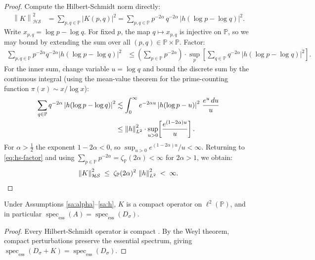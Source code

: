 \documentclass[12pt,letterpaper]{article}
\theoremstyle{definition}
\theoremstyle{remark}
\DeclareMathOperator{\spec}{spec}
\newcommand{\PP}{\mathbb{P}}
\newcommand{\HS}{\mathcal{HS}}
\newcommand{\norm}[1]{\left\|#1\right\|}
\newcommand{\abs}[1]{\left|#1\right|}
\newcommand{\lp}{\ell^2(\PP)}
\begin{document}
\begin{proof}
Compute the Hilbert-Schmidt norm directly:
\begin{align}
  \norm{K}_{\HS}^2
  &= \sum_{p,q \in \PP} \abs{K(p,q)}^2
   = \sum_{p,q \in \PP} p^{-2\alpha}\, q^{-2\alpha}\,
     \abs{h(\log p - \log q)}^2.
  \label{eq:hs-sum}
\end{align}
Write $x_{p,q} = \log p - \log q$. For fixed $p$, the map $q \mapsto x_{p,q}$
is injective on $\PP$, so we may bound by extending the sum over all
$(p,q) \in \PP \times \PP$. Factor:
\begin{align}
  \sum_{p,q \in \PP}
    p^{-2\alpha} q^{-2\alpha} \abs{h(\log p - \log q)}^2
  &\leq
  \left(\sum_{p \in \PP} p^{-2\alpha}\right)
  \cdot
  \sup_{p}\!\left[\sum_{q \in \PP} q^{-2\alpha}\,
    \abs{h(\log p - \log q)}^2\right].
  \label{eq:hs-factor}
\end{align}
For the inner sum, change variable $u = \log q$ and bound the discrete sum
by the continuous integral (using the mean-value theorem for the prime-counting
function $\pi(x) \sim x/\log x$):
\begin{align}
  \sum_{q \in \PP} q^{-2\alpha} \abs{h(\log p - \log q)}^2
  &\lesssim \int_0^\infty e^{-2\alpha u} \abs{h(\log p - u)}^2\,
    \frac{e^u\,du}{u} \notag\\
  &\leq \norm{h}_{L^2}^2 \cdot
    \sup_{u > 0}\!\left[\frac{e^{(1-2\alpha)u}}{u}\right].
  \label{eq:inner-integral}
\end{align}
For $\alpha > \tfrac{1}{2}$ the exponent $1-2\alpha < 0$, so
$\sup_{u>0} e^{(1-2\alpha)u}/u < \infty$.
Returning to \eqref{eq:hs-factor} and using
$\sum_{p \in \PP} p^{-2\alpha} = \zeta_\PP(2\alpha) < \infty$ for
$2\alpha > 1$, we obtain:
\[
  \norm{K}_{\HS}^2
  \;\leq\; \zeta_\PP(2\alpha)^2\, \norm{h}_{L^2}^2
  \;<\; \infty. \qedhere
\]
\end{proof}

\begin{appcorollary}[Compactness of $K$]
\label{cor:compact}
Under Assumptions \ref{sa:alpha}--\ref{sa:h}, $K$ is a compact operator on
$\lp$, and in particular $\spec_{\mathrm{ess}}(A) = \spec_{\mathrm{ess}}(D_\sigma)$.
\end{appcorollary}

\begin{proof}
Every Hilbert-Schmidt operator is compact \cite[Thm.~VI.22]{reed_simon}.
By the Weyl theorem, compact perturbations preserve the essential spectrum,
giving $\spec_{\mathrm{ess}}(D_\sigma + K) = \spec_{\mathrm{ess}}(D_\sigma)$.
\end{proof}
\end{document}
